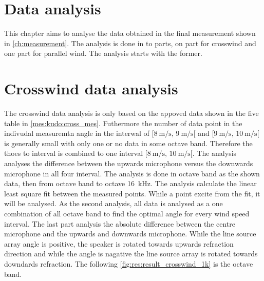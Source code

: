 \section{Data analysis}
This chapter aims to analyse the data obtained in the final measurement shown in \autoref{ch:measurement}. The analysis is done in to parts, on part for crosswind and one part for parallel wind. The analysis starts with the former. 



\section{Crosswind data analysis}\label{res:cross_data_ana}
The crosswind data analysis is only based on the appoved data shown in the five table in \autoref{mes:kudo:cross_mes}. Futhermore the number of data point in the indivudal measuremtn angle in the interwal of $[\SI{8}{\meter\per\second},\, \SI{9}{\meter\per\second}[ $ and $[\SI{9}{\meter\per\second},\, \SI{10}{\meter\per\second}[ $ is generally small with only one or no data in some octave band. Therefore the thoes to interval is combined to one interval $[\SI{8}{\meter\per\second},\, \SI{10}{\meter\per\second}[ $. The analysis analyses the difference between the upwards microphone versus the downwards microphone in all four interval. The analysis is done in octave band as the shown data, then from octave band  to octave \SI{16}{\kilo\hertz}. The analysis calculate the linear least square fit between the measured points. While a point excite  from the fit, it will be analysed. As the second analysis, all data is analysed as a one combination of all octave band to find the optimal angle for every wind speed interval. The last part analysis the absolute difference between the centre microphone and the upwards and downwards microphone. While the line source array angle is positive, the speaker is rotated towards upwards refraction direction and while the angle is nagative the line source array is rotated towards downdards refraction. The following \autoref{fig:res:result_crosswind_1k}  is the  octave band. 


 

